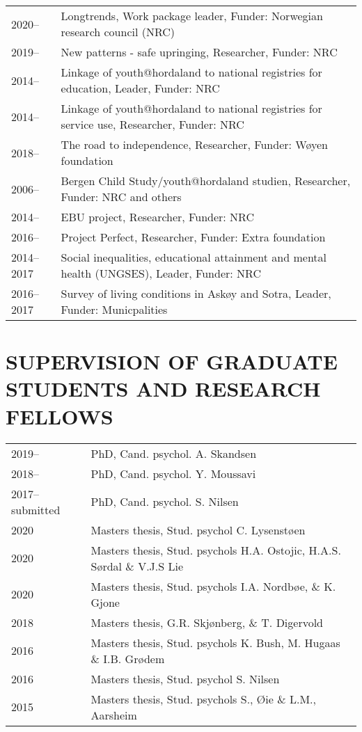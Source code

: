 \documentclass[11pt,a4paper,a4paper]{article}
\begin{document}
\begin{tabular}{ll}
  2020-- & Longtrends, Work package leader, Funder: Norwegian research council (NRC) \\ 
  2019-- & New patterns - safe upringing, Researcher, Funder: NRC \\ 
  2014-- & Linkage of youth@hordaland to national registries for education, Leader, Funder: NRC \\ 
  2014-- & Linkage of youth@hordaland to national registries for service use, Researcher, Funder: NRC \\ 
  2018-- & The road to independence, Researcher, Funder: Wøyen foundation \\ 
  2006-- & Bergen Child Study/youth@hordaland studien, Researcher, Funder: NRC and others \\ 
  2014-- & EBU project, Researcher, Funder: NRC \\ 
  2016-- & Project Perfect, Researcher, Funder: Extra foundation \\ 
  2014--2017 & Social inequalities, educational attainment and mental health (UNGSES), Leader, Funder: NRC \\ 
  2016--2017 & Survey of living conditions in Askøy and Sotra, Leader, Funder: Municpalities \\ 
  \end{tabular}

\hypertarget{supervision-of-graduate-students-and-research-fellows}{%
\section{SUPERVISION OF GRADUATE STUDENTS AND RESEARCH FELLOWS}\label{supervision-of-graduate-students-and-research-fellows}}

\begin{tabular}{ll}
  2019-- & PhD, Cand. psychol. A. Skandsen \\ 
  2018-- & PhD, Cand. psychol. Y. Moussavi \\ 
  2017--submitted & PhD, Cand. psychol. S. Nilsen \\ 
  2020 & Masters thesis, Stud. psychol C. Lysenstøen \\ 
  2020 & Masters thesis, Stud. psychols H.A. Ostojic, H.A.S. Sørdal \& V.J.S Lie \\ 
  2020 & Masters thesis, Stud. psychols I.A. Nordbøe, \& K. Gjone \\ 
  2018 & Masters thesis, G.R. Skjønberg, \& T. Digervold \\ 
  2016 & Masters thesis, Stud. psychols K. Bush, M. Hugaas \& I.B. Grødem \\ 
  2016 & Masters thesis, Stud. psychol S. Nilsen \\ 
  2015 & Masters thesis, Stud. psychols S., Øie  \& L.M., Aarsheim \\ 
  \end{tabular}
\end{document}
